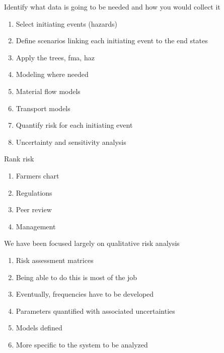 \documentclass[aspectratio=1610,pdftex,dvipsnames,compress,xcolor={dvipsnames}]{beamer}
\newcommand{\acs}{\acrshort} %
\begin{document}
\begin{frame}{Identify what data is going to be needed and how you would collect it}
    \begin{enumerate}[series=outerlist,topsep=0pt,itemsep=11pt,leftmargin=*,label=(\arabic*)]
        \item[]Select initiating events (hazards)
        \item[]Define scenarios linking each initiating event to the end states  
        \item[]Apply the trees, \acs{fma}, \acs{haz}
        \item[]Modeling where needed  
        \item[]Material flow models  
        \item[]Transport models  
        \item[]Quantify risk for each initiating event  
        \item[]Uncertainty and sensitivity analysis
    \end{enumerate}
\end{frame}


\begin{frame}{Rank risk}
    \begin{enumerate}[series=outerlist,topsep=0pt,itemsep=21pt,leftmargin=*,label=(\arabic*)]
        \item[]Farmers chart
        \item[]Regulations
        \item[]Peer review
        \item[]Management
    \end{enumerate}
\end{frame}


\begin{frame}{We have been focused largely on qualitative risk analysis}
    \begin{enumerate}[series=outerlist,topsep=0pt,itemsep=17pt,leftmargin=*,label=(\arabic*)]
        \item[]Risk assessment matrices 
        \item[]Being able to do this is most of the job
        \item[]Eventually, frequencies have to be developed
        \item[]Parameters quantified with associated uncertainties
        \item[]Models defined
        \item[]More specific to the system to be analyzed
    \end{enumerate}
\end{frame}
\end{document}
